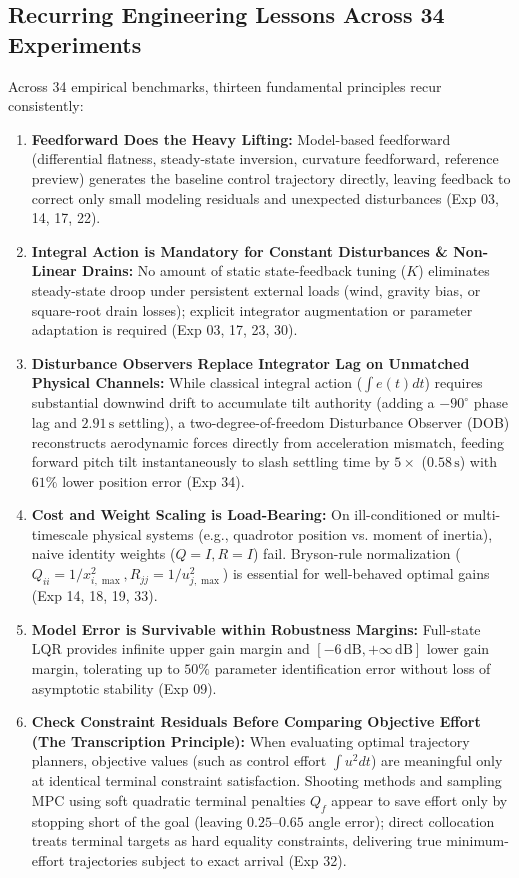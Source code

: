 \documentclass[11pt,a4paper]{article}
\begin{document}
\subsection{Recurring Engineering Lessons Across 34 Experiments}

Across 34 empirical benchmarks, thirteen fundamental principles recur consistently:
\begin{enumerate}
  \item \textbf{Feedforward Does the Heavy Lifting:} Model-based feedforward (differential flatness, steady-state inversion, curvature feedforward, reference preview) generates the baseline control trajectory directly, leaving feedback to correct only small modeling residuals and unexpected disturbances (Exp 03, 14, 17, 22).
  \item \textbf{Integral Action is Mandatory for Constant Disturbances \& Non-Linear Drains:} No amount of static state-feedback tuning ($K$) eliminates steady-state droop under persistent external loads (wind, gravity bias, or square-root drain losses); explicit integrator augmentation or parameter adaptation is required (Exp 03, 17, 23, 30).
  \item \textbf{Disturbance Observers Replace Integrator Lag on Unmatched Physical Channels:} While classical integral action ($\int e(t) dt$) requires substantial downwind drift to accumulate tilt authority (adding a $-90^\circ$ phase lag and $2.91\,\text{s}$ settling), a two-degree-of-freedom Disturbance Observer (DOB) reconstructs aerodynamic forces directly from acceleration mismatch, feeding forward pitch tilt instantaneously to slash settling time by $5\times$ ($0.58\,\text{s}$) with $61\%$ lower position error (Exp 34).
  \item \textbf{Cost and Weight Scaling is Load-Bearing:} On ill-conditioned or multi-timescale physical systems (e.g., quadrotor position vs. moment of inertia), naive identity weights ($Q=I, R=I$) fail. Bryson-rule normalization ($Q_{ii} = 1/x_{i,\max}^2, R_{jj} = 1/u_{j,\max}^2$) is essential for well-behaved optimal gains (Exp 14, 18, 19, 33).
  \item \textbf{Model Error is Survivable within Robustness Margins:} Full-state LQR provides infinite upper gain margin and $[-6\,\text{dB}, +\infty\,\text{dB}]$ lower gain margin, tolerating up to $50\%$ parameter identification error without loss of asymptotic stability (Exp 09).
  \item \textbf{Check Constraint Residuals Before Comparing Objective Effort (The Transcription Principle):} When evaluating optimal trajectory planners, objective values (such as control effort $\int u^2 dt$) are meaningful only at identical terminal constraint satisfaction. Shooting methods and sampling MPC using soft quadratic terminal penalties $Q_f$ appear to save effort only by stopping short of the goal (leaving $0.25\text{--}0.65$ angle error); direct collocation treats terminal targets as hard equality constraints, delivering true minimum-effort trajectories subject to exact arrival (Exp 32).

\end{enumerate}
\end{document}
